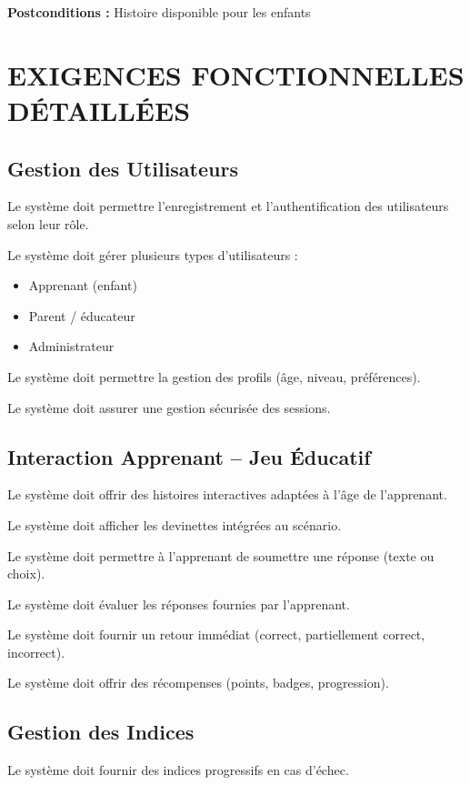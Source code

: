 \documentclass[12pt,a4paper]{article}
\begin{document}
\textbf{Postconditions :} Histoire disponible pour les enfants


\newpage

\section{EXIGENCES FONCTIONNELLES DÉTAILLÉES}

\subsection{Gestion des Utilisateurs}

Le système doit permettre l'enregistrement et l'authentification des utilisateurs selon leur rôle.

Le système doit gérer plusieurs types d'utilisateurs :
\begin{itemize}
    \item Apprenant (enfant)
    \item Parent / éducateur
    \item Administrateur
\end{itemize}

Le système doit permettre la gestion des profils (âge, niveau, préférences).

Le système doit assurer une gestion sécurisée des sessions.

\subsection{Interaction Apprenant -- Jeu Éducatif}

Le système doit offrir des histoires interactives adaptées à l'âge de l'apprenant.

Le système doit afficher les devinettes intégrées au scénario.

Le système doit permettre à l'apprenant de soumettre une réponse (texte ou choix).

Le système doit évaluer les réponses fournies par l'apprenant.

Le système doit fournir un retour immédiat (correct, partiellement correct, incorrect).

Le système doit offrir des récompenses (points, badges, progression).

\subsection{Gestion des Indices}

Le système doit fournir des indices progressifs en cas d'échec.
\end{document}
